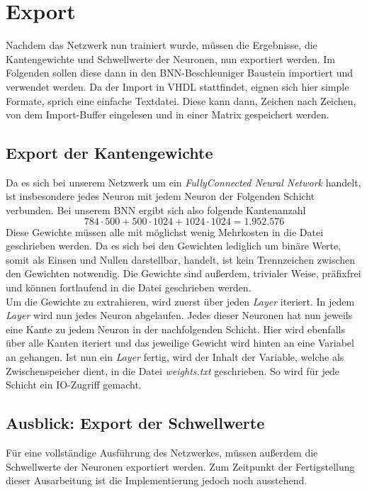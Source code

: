 \chapter{Export}
Nachdem das Netzwerk nun trainiert wurde, müssen die Ergebnisse, die Kantengewichte und Schwellwerte der Neuronen, nun exportiert werden. Im Folgenden sollen diese dann in den BNN-Beschleuniger Baustein importiert und verwendet werden. Da der Import in VHDL stattfindet, eignen sich hier simple Formate, sprich eine einfache Textdatei. Diese kann dann, Zeichen nach Zeichen, von dem Import-Buffer eingelesen und in einer Matrix gespeichert werden.
\section{Export der Kantengewichte}\label{exportKanten}
Da es sich bei unserem Netzwerk um ein \textit{FullyConnected Neural Network} handelt, ist insbesondere jedes Neuron mit jedem Neuron der Folgenden Schicht verbunden. Bei unserem BNN ergibt sich also folgende Kantenanzahl
\[784 \cdot 500 + 500 \cdot 1024 + 1024 \cdot 1024 = 1.952.576 \]
Diese Gewichte müssen alle mit möglichst wenig Mehrkosten in die Datei geschrieben werden. Da es sich bei den Gewichten lediglich um binäre Werte, somit als Einsen und Nullen darstellbar, handelt, ist kein Trennzeichen zwischen den Gewichten notwendig. Die Gewichte sind außerdem, trivialer Weise, präfixfrei und können fortlaufend in die Datei geschrieben werden.\\
Um die Gewichte zu extrahieren, wird zuerst über jeden \textit{Layer} iteriert. In jedem \textit{Layer} wird nun jedes Neuron abgelaufen. Jedes dieser Neuronen hat nun jeweils eine Kante zu jedem Neuron in der nachfolgenden Schicht. Hier wird ebenfalls über alle Kanten iteriert und das jeweilige Gewicht wird hinten an eine Variabel an gehangen. Ist nun ein \textit{Layer} fertig, wird der Inhalt der Variable, welche als Zwischenspeicher dient, in die Datei \textit{weights.txt} geschrieben. So wird für jede Schicht ein IO-Zugriff gemacht.
\section{Ausblick: Export der Schwellwerte}
Für eine vollständige Ausführung des Netzwerkes, müssen außerdem die Schwellwerte der Neuronen exportiert werden. Zum Zeitpunkt der Fertigstellung dieser Ausarbeitung ist die Implementierung jedoch noch ausstehend.
